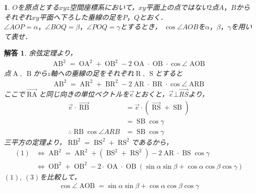 \documentclass[dvipdfmx]{jsarticle}
\newtheorem*{answer*}{解答}
\newtheorem{prob}{}[]
\begin{document}
\begin{screen}
  \begin{prob}
    $O$を原点とする$xyz$空間座標系において，$xy$平面上の点ではない$2$点$A，B$からそれぞれ$xy$平面へ下ろした垂線の足を$P，Q$とおく．
    $\angle AOP=\alpha ，\angle BOQ=\beta，\angle POQ=\gamma$とするとき，
    $\cos \angle AOB$を$\alpha，\beta，\gamma$を用いて表せ．  
  \end{prob}
  \end{screen}
\begin{answer*}
    余弦定理より，
    \begin{align*}
      \operatorname{AB}^2=\operatorname{OA}^2+\operatorname{OB}^2-2\operatorname{OA}\cdot\operatorname{OB}\cdot\cos \angle\operatorname{AOB}\tag{1}
    \end{align*}
    点$\operatorname{A},\ \operatorname{B}$から$z$軸への垂線の足をそれぞれ$\operatorname{R},\ \operatorname{S}$とすると
    \begin{align*}
      \operatorname{AB}^2=\operatorname{AR}^2+\operatorname{BR}^2-2\operatorname{AR}\cdot\operatorname{BR}\cdot\cos \angle\operatorname{ARB}\tag{2}
    \end{align*}
    ここで$\overrightarrow{\operatorname{RA}} $と同じ向きの単位ベクトルを$\overrightarrow{e}$とおくと，$\overrightarrow{e}\bot \overrightarrow{RS} $より，
    \begin{align*}
      \overrightarrow{e}\cdot\overrightarrow{\operatorname{RB}}
      &= \overrightarrow{e}\cdot \left(\overrightarrow{\operatorname{RS}}+ \operatorname{SB}\right)\\
      &= \operatorname{SB}\cos \gamma \\
      \therefore \operatorname{RB}\cos \angle ARB&=\operatorname{SB}\cos \gamma
    \end{align*}
    三平方の定理より，$\operatorname{RB}^2=\operatorname{BS}^2+\operatorname{RS}^2$であるから，
    \begin{align*}
      (1)
      &\Longleftrightarrow \operatorname{AB}^2=\operatorname{AR}^2+(\operatorname{BS}^2+\operatorname{RS}^2)-2\operatorname{AR}\cdot\operatorname{BS}\cos\gamma\\
      &\Longleftrightarrow \operatorname{OB}^2+\operatorname{OB}^2-2\cdot\operatorname{OA}\cdot\operatorname{OB}(\sin\alpha\sin\beta+\cos\alpha\cos\beta\cos\gamma)\tag{3}
    \end{align*}
    $(1),\ (3)$を比較して，
    \begin{align*}
      \cos\angle\operatorname{AOB}=\sin\alpha\sin\beta+\cos\alpha\cos\beta\cos\gamma
    \end{align*}
    \rightline{$\Large{\Box} $}
\end{answer*}
  \newpage
  
\end{document}

